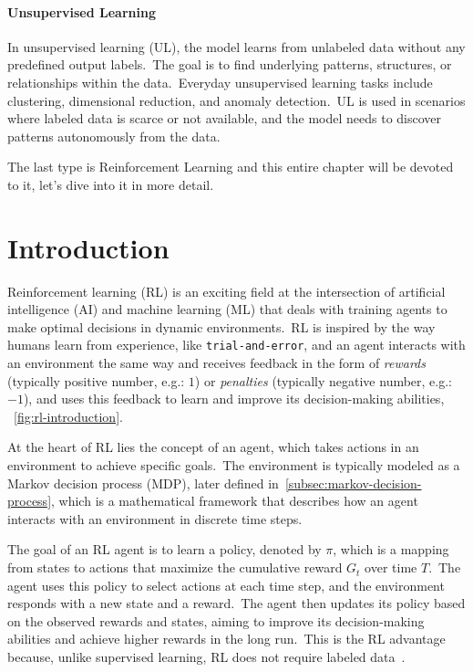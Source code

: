 \documentclass[../xlapes02]{subfiles}
\begin{document}
    \paragraph{Unsupervised Learning}\label{par:unsupervised-learning}
    In unsupervised learning (UL), the model learns from unlabeled data without any predefined output labels.\ The goal is to find underlying patterns, structures, or relationships within the data.\ Everyday unsupervised learning tasks include clustering, dimensional reduction, and anomaly detection.\ UL is used in scenarios where labeled data is scarce or not available, and the model needs to discover patterns autonomously from the data.

    The last type is Reinforcement Learning and this entire chapter will be devoted to it, let's dive into it in more detail.


    \section{Introduction}\label{sec:rl-introduction}
    Reinforcement learning (RL) is an exciting field at the intersection of artificial intelligence (AI) and machine learning (ML) that deals with training agents to make optimal decisions in dynamic environments.\ RL is inspired by the way humans learn from experience, like \texttt{trial-and-error}, and an agent interacts with an environment the same way and receives feedback in the form of \emph{rewards} (typically positive number, e.g.: $1$) or \emph{penalties} (typically negative number, e.g.: $-1$), and uses this feedback to learn and improve its decision-making abilities, ~\cref{fig:rl-introduction}.

    At the heart of RL lies the concept of an agent, which takes actions in an environment to achieve specific goals.\ The environment is typically modeled as a Markov decision process (MDP), later defined in~\cref{subsec:markov-decision-process}, which is a mathematical framework that describes how an agent interacts with an environment in discrete time steps.

    The goal of an RL agent is to learn a policy, denoted by $\pi$, which is a mapping from states to actions that maximize the cumulative reward $G_t$ over time $T$.\ The agent uses this policy to select actions at each time step, and the environment responds with a new state and a reward.\ The agent then updates its policy based on the observed rewards and states, aiming to improve its decision-making abilities and achieve higher rewards in the long run.\ This is the RL advantage because, unlike supervised learning, RL does not require labeled data~\cite{rl-course-david-silver}.
\end{document}
